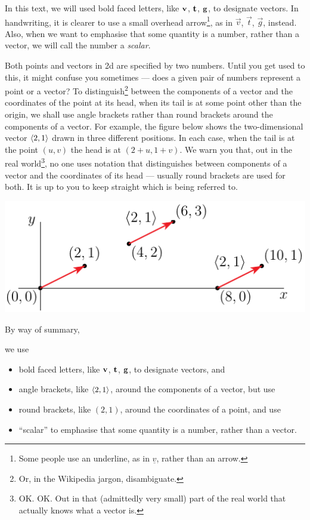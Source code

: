 In this text, we will used bold faced letters, like $\mathbf{v}$, $\mathbf{t}$, $\mathbf{g}$,
to designate vectors. In handwriting, it is clearer to use a small 
overhead arrow\footnote{Some people use an underline, as in $\underline{v}$,
rather than an arrow.}, as in $\vec{v}$, $\vec{t}$, $\vec{g}$, instead. 
Also, when we want to emphasise that some quantity is a number,
rather than a vector, we will call the number a \emph{scalar}. 


Both points and vectors in 2d are specified by two numbers. Until 
you get used to this, it might confuse you sometimes --- does a given pair of 
numbers represent a point or a vector?
To distinguish\footnote{Or, in the Wikipedia jargon, disambiguate.}
between the components of a vector and the coordinates 
of the point at its head, when its tail is at some point other than 
the origin, we shall use angle brackets rather than round brackets 
around the components of a vector. For example, the figure below shows 
the two-dimensional vector $\left< 2,1\right>$ drawn in three different positions.
In each case, when the tail is at the point $(u,v)$ the head is at 
$(2+u,1+v)$. We warn you that, out in the  real world\footnote{OK. OK. Out in 
that (admittedly very small) part of the real world that actually knows 
what a vector is.}, no one uses notation
that distinguishes between components of a vector and the coordinates of its 
head --- usually round brackets are used for both. It is up to you to 
keep straight which is being referred to.

\begin{efig}
  \begin{center}
  \includegraphics{positions.pdf}
  \end{center}
\end{efig}

By way of summary, 
\begin{notn}\label{not scalar vector}
we use
\begin{itemize}\itemsep1pt \parskip0pt 
\item
bold faced letters, like $\mathbf{v}$, $\mathbf{t}$, $\mathbf{g}$, to designate vectors,
and
\item
angle brackets, like $\left< 2,1\right>$, around the components of a vector,
but use
\item
round brackets, like $(2,1)$, around the coordinates of a point,
and use
\item ``scalar'' to emphasise that some quantity is a number,
rather than a vector.
\end{itemize}
\end{notn}

